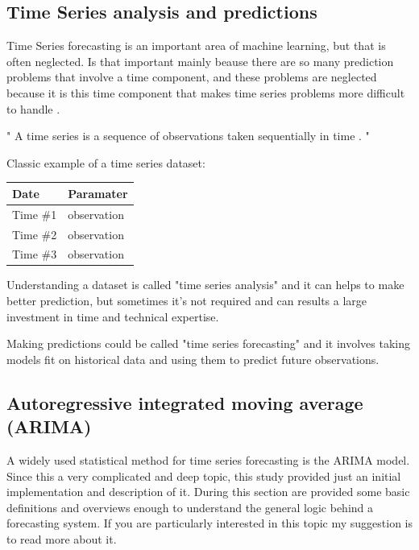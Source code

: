 \newpage

\subsection{Time Series analysis and predictions}
  \vspace{-5mm}
Time Series forecasting is an important area of machine learning, but that is often neglected. Is that important mainly beause there are so many prediction problems that involve a time component, and these problems are neglected because it is this time component that makes time series problems more difficult to handle \cite{previousWork}.

" A time series is a sequence of observations taken sequentially in time \cite{TimeSeries}. " 

Classic example of a time series dataset:

\begin{tabular}{ | l | l | }
\hline 		\textbf{Date}	&	\textbf{Paramater} \\ \hline
				Time \#1	&	observation \\ \hline	
				Time \#2	&	observation \\ \hline	
				Time \#3	&	observation \\ \hline											
\end{tabular}

Understanding a dataset is called "time series analysis" and it can helps to make better prediction, but sometimes it's not required and can results a large investment in time and technical expertise.

Making predictions could be called "time series forecasting" and it involves taking models fit on historical data and using them to predict future observations.

\subsection{Autoregressive integrated moving average (ARIMA)}
\vspace{-5mm}
A widely used statistical method for time series forecasting is the ARIMA model. Since this a very complicated and deep topic, this study provided just an initial implementation and description of it. During this section are provided some basic definitions and overviews enough to understand the general logic behind a forecasting system. If you are particularly interested in this topic my suggestion is to read more about it.

